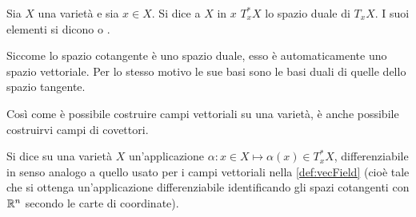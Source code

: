 \begin{definition}
  Sia $X$ una varietà e sia $x \in X$. Si dice  a $X$ in $x$ $T_x^* X$ lo spazio duale di $T_x X$. I suoi elementi si dicono  o .
\end{definition}
\begin{remark}
  Siccome lo spazio cotangente è uno spazio duale, esso è automaticamente uno spazio vettoriale. Per lo stesso motivo le sue basi sono le basi duali di quelle dello spazio tangente.
\end{remark}



Così come è possibile costruire campi vettoriali su una varietà, è anche possibile costruirvi campi di covettori.
\begin{definition} \label{def:1formCvc}
  Si dice  su una varietà $X$ un'applicazione $\alpha: x \in X \mapsto \alpha(x) \in T_x^* X$, differenziabile in senso analogo a quello usato per i campi vettoriali nella \autoref{def:vecField} (cioè tale che si ottenga un'applicazione differenziabile identificando gli spazi cotangenti con $\mathbb{R}^{n}$ secondo le carte di coordinate).
\end{definition}

